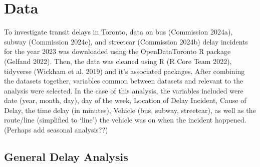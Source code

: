 \documentclass[
  letterpaper,
  DIV=11,
  numbers=noendperiod]{scrartcl}
\begin{document}
\section{Data}\label{sec-data}

To investigate transit delays in Toronto, data on bus (Commission
2024a), subway (Commission 2024c), and streetcar (Commission 2024b)
delay incidents for the year 2023 was downloaded using the
OpenDataToronto R package (Gelfand 2022). Then, the data was cleaned
using R (R Core Team 2022), tidyverse (Wickham et al. 2019) and it's
associated packages. After combining the datasets together, variables
common between datasets and relevant to the analysis were selected. In
the case of this analysis, the variables included were date (year,
month, day), day of the week, Location of Delay Incident, Cause of
Delay, the time delay (in minutes), Vehicle (bus, subway, streetcar), as
well as the route/line (simplified to `line') the vehicle was on when
the incident happened. (Perhaps add seasonal analysis??)

\subsection{General Delay Analysis}\label{subsec1-data}

\begin{table}

\caption{\label{tbl-cleaned\_data}Sample of Cleaned Delay Data}


\end{table}%
\end{document}
